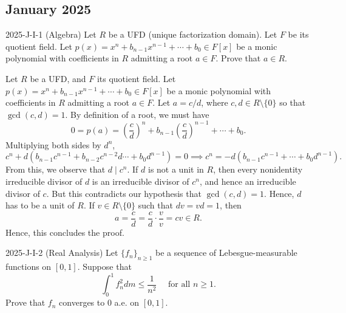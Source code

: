 \documentclass{article}
\begin{document}
\subsection{January 2025}
\begin{prb}{2025-J-I-1 (Algebra)}
Let $R$ be a UFD (unique factorization domain). Let $F$ be its quotient field. Let $p(x) = x^{n} + b_{n - 1}x^{n- 1} + \dotsm + b_{0} \in F[x]$ be a monic polynomial with coefficients in $R$ admitting a root $a \in F$. Prove that $a \in R$. 
\end{prb}
\begin{solutions}
	Let $R$ be a UFD, and $F$ its quotient field. Let $p(x) = x^{n} + b_{n- 1}x^{n - 1} + \dotsm + b_{0} \in F[x]$ be a monic polynomial with coefficients in $R$ admitting a root $a \in F$. Let $a = c/d$, where $c, d \in R\setminus \{0\}$ so that $\gcd(c, d) = 1$. By definition of a root, we must have 
		\begin{equation}
			0 = p(a) = \left(\frac{c}{d}\right)^{n} + b_{n - 1}\left(\frac{c}{d}\right)^{n - 1} + \dotsm + b_{0}. 
		\end{equation}
	Multiplying both sides by $d^{n}$, 
		\begin{equation}
			c^{n} + d(b_{n-1}c^{n-1} + b_{n - 2}c^{n - 2}d \dotsm + b_{0}d^{n-1}) = 0 \implies c^{n} = -d(b_{n - 1}c^{n - 1} + \dotsm + b_{0}d^{n-1}). 
		\end{equation}
	From this, we observe that $d \mid c^{n}$. If $d$ is not a unit in $R$, then every nonidentity irreducible divisor of $d$ is an irreducible divisor of $c^{n}$, and hence an irreducible divisor of $c$. But this contradicts our hypothesis that $\gcd(c, d) = 1$. Hence, $d$ has to be a unit of $R$. If $v \in R\setminus \{0\}$ such that $dv= vd = 1$, then 
		\begin{equation}
			a = \frac{c}{d} = \frac{c}{d}\cdot \frac{v}{v} = cv \in R. 
		\end{equation}
	Hence, this concludes the proof. 
\end{solutions}
\begin{prb}{2025-J-I-2 (Real Analysis)}
	Let $\{f_{n}\}_{n\geq 1}$ be a sequence of Lebesgue-measurable functions on $[0,1]$. Suppose that 
		\begin{equation*}
			\int_{0}^{1}f^{2}_{n}dm \leq \frac{1}{n^{2}} \quad \text{ for all $n\geq 1$}. 
		\end{equation*}
	Prove that $f_{n}$ converges to $0$ a.e. on $[0,1]$. 
\end{prb}
\end{document}
